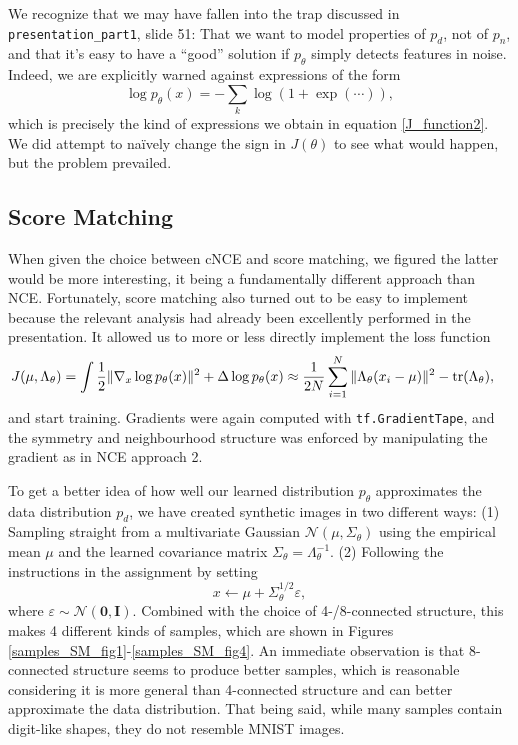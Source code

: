 \documentclass[a4paper]{article}
\theoremstyle{definition}
\theoremstyle{plain}
\begin{document}
We recognize that we may have fallen into the trap discussed in \texttt{presentation\_part1}, slide 51: That we want to model properties of $p_d$, not of $p_n$, and that it's easy to have a ``good'' solution if $p_\theta$ simply detects features in noise. Indeed, we are explicitly warned against expressions of the form
$$\log p_\theta(x) = -\sum_k \log(1 + \exp(\cdots)),$$
which is precisely the kind of expressions we obtain in equation \eqref{J_function2}. We did attempt to naïvely change the sign in $J(\theta)$ to see what would happen, but the problem prevailed.


\subsection*{Score Matching}

When given the choice between cNCE and score matching, we figured the latter would be more interesting, it being a fundamentally different approach than NCE. Fortunately, score matching also turned out to be easy to implement because the relevant analysis had already been excellently performed in the presentation. It allowed us to more or less directly implement the loss function
\begin{alignat*}{1}
J(\mu,\Lambda_\theta) &= \int \frac{1}{2} \|\nabla_x \log p_\theta(x)\|^2 + \Delta \log p_\theta(x) \approx \frac{1}{2N} \sum_{i=1}^N \| \Lambda_\theta (x_i - \mu)\|^2 - \tr(\Lambda_\theta),
\end{alignat*}
and start training. Gradients were again computed with \texttt{tf.GradientTape}, and the symmetry and neighbourhood structure was enforced by manipulating the gradient as in NCE approach 2.

To get a better idea of how well our learned distribution $p_\theta$ approximates the data distribution $p_d$, we have created synthetic images in two different ways: (1) Sampling straight from a multivariate Gaussian $\mathcal{N}(\mu,\Sigma_\theta)$ using the empirical mean $\mu$ and the learned covariance matrix $\Sigma_\theta = \Lambda_\theta^{-1}$. (2) Following the instructions in the assignment by setting
$$x \leftarrow \mu + \Sigma_\theta^{1/2}\varepsilon,$$
where $\varepsilon \sim \mathcal{N}(\mathbf{0},\mathbf{I})$. Combined with the choice of 4-/8-connected structure, this makes 4 different kinds of samples, which are shown in Figures \ref{samples_SM_fig1}-\ref{samples_SM_fig4}. An immediate observation is that 8-connected structure seems to produce better samples, which is reasonable considering it is more general than 4-connected structure and can better approximate the data distribution. That being said, while many samples contain digit-like shapes, they do not resemble  MNIST images.
\end{document}
